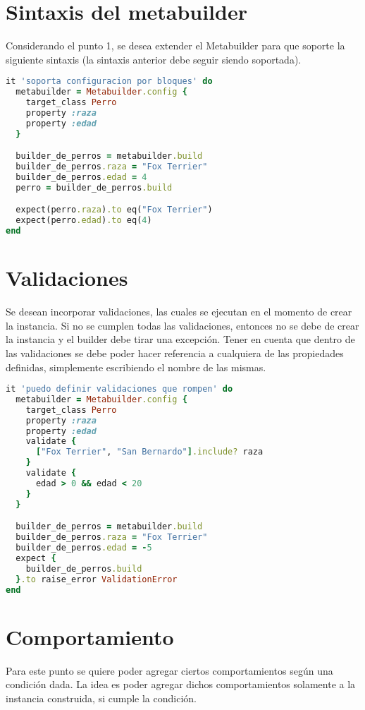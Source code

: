 \documentclass[spanish,a4paper]{article}
\begin{document}
\section{Sintaxis del metabuilder}
Considerando el punto 1, se desea extender el Metabuilder para que soporte la siguiente sintaxis (la sintaxis anterior debe seguir siendo soportada).

  \begin{lstlisting}[language=Ruby]
it 'soporta configuracion por bloques' do
  metabuilder = Metabuilder.config {
    target_class Perro
    property :raza
    property :edad
  }

  builder_de_perros = metabuilder.build
  builder_de_perros.raza = "Fox Terrier"
  builder_de_perros.edad = 4
  perro = builder_de_perros.build

  expect(perro.raza).to eq("Fox Terrier")
  expect(perro.edad).to eq(4)
end
  \end{lstlisting}

\section{Validaciones}

Se desean incorporar validaciones, las cuales se ejecutan en el momento de crear la instancia. Si no se cumplen todas las validaciones, entonces no se debe de crear la instancia y el builder debe tirar una excepción.
Tener en cuenta que dentro de las validaciones se debe poder hacer referencia a cualquiera de las propiedades definidas, simplemente escribiendo el nombre de las mismas.

  \begin{lstlisting}[language=Ruby]
it 'puedo definir validaciones que rompen' do
  metabuilder = Metabuilder.config {
    target_class Perro
    property :raza
    property :edad
    validate {
      ["Fox Terrier", "San Bernardo"].include? raza
    }
    validate {
      edad > 0 && edad < 20
    }
  }

  builder_de_perros = metabuilder.build
  builder_de_perros.raza = "Fox Terrier"
  builder_de_perros.edad = -5
  expect {
    builder_de_perros.build
  }.to raise_error ValidationError
end
  \end{lstlisting}

\section{Comportamiento}

Para este punto se quiere poder agregar ciertos comportamientos según una condición dada. La idea es poder agregar dichos comportamientos solamente a la instancia construida, si cumple la condición.
\end{document}
